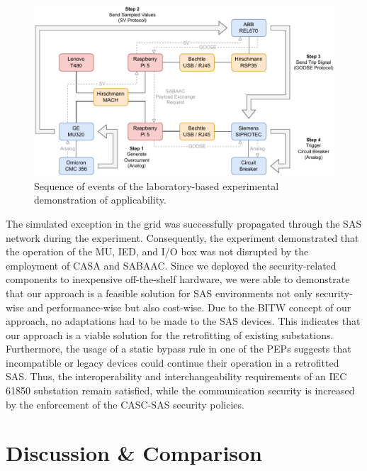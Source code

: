 \begin{figure}
    \centering
    \includegraphics[width=1.0\linewidth]{figures/lab_evaluation_steps.drawio.pdf}
    \caption{Sequence of events of the laboratory-based experimental demonstration of applicability.}
    \label{fig:lab_steps}
\end{figure}

The simulated exception in the grid was successfully propagated through the SAS network during the experiment.
Consequently, the experiment demonstrated that the operation of the MU, IED, and I/O box was not disrupted by the employment of CASA and SABAAC.
Since we deployed the security-related components to inexpensive off-the-shelf hardware, we were able to demonstrate that our approach is a feasible solution for SAS environments not only security-wise and performance-wise but also cost-wise.
Due to the BITW concept of our approach, no adaptations had to be made to the SAS devices.
This indicates that our approach is a viable solution for the retrofitting of existing substations.
Furthermore, the usage of a static bypass rule in one of the PEPs suggests that incompatible or legacy devices could continue their operation in a retrofitted SAS.
Thus, the interoperability and interchangeability requirements of an IEC 61850 substation remain satisfied, while the communication security is increased by the enforcement of the CASC-SAS security policies.

\section{Discussion \& Comparison}
